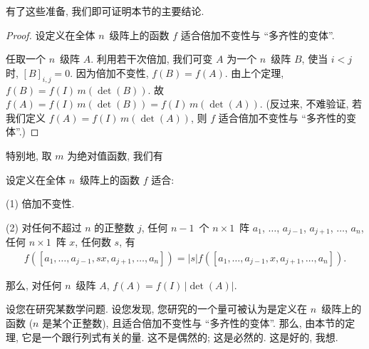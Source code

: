 有了这些准备, 我们即可证明本节的主要结论.

\begin{proof}
    设定义在全体 \(n\)~级阵上的函数 \(f\)
    适合倍加不变性与 ``多齐性的变体''.

    任取一个 \(n\)~级阵 \(A\).
    利用若干次倍加,
    我们可变 \(A\) 为一个 \(n\)~级阵 \(B\),
    使当 \(i < j\) 时, \([B]_{i,j} = 0\).
    因为倍加不变性, \(f(B) = f(A)\).
    由上个定理, \(f(B) = f(I)\, m(\det {(B)})\).
    故 \(f(A) = f(I)\, m(\det {(B)})
    = f(I)\, m(\det {(A)})\).
    (反过来, 不难验证, 若我们定义
    \(f(A) = f(I)\, m(\det {(A)})\),
    则 \(f\) 适合倍加不变性与 ``多齐性的变体''.)
\end{proof}

特别地, 取 \(m\) 为绝对值函数, 我们有

\begin{theorem}
    设定义在全体 \(n\)~级阵上的函数 \(f\)
    适合:

    (1)
    倍加不变性.

    (2)
    对任何不超过 \(n\) 的正整数 \(j\),
    任何 \(n-1\)~个 \(n \times 1\)~阵
    \(a_1\), \(\dots\), \(a_{j-1}\),
    \(a_{j+1}\), \(\dots\), \(a_n\),
    任何 \(n \times 1\)~阵 \(x\),
    任何数 \(s\),
    有
    \begin{align*}
        f {([a_1, \dots, a_{j-1}, sx, a_{j+1}, \dots, a_n])}
        =
        |s|
        f {([a_1, \dots, a_{j-1}, x, a_{j+1}, \dots, a_n])}.
    \end{align*}

    那么, 对任何 \(n\)~级阵 \(A\),
    \(f(A) = f(I)\, |{\det {(A)}}|\).
\end{theorem}

设您在研究某数学问题.
设您发现, 您研究的一个量可被认为是定义在 \(n\)~级阵上的函数
(\(n\) 是某个正整数),
且适合倍加不变性与 ``多齐性的变体''.
那么, 由本节的定理, 它是一个跟行列式有关的量.
这不是偶然的; 这是必然的.
这是好的, 我想.

